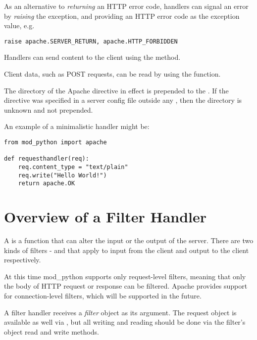 As an alternative to \emph{returning} an HTTP error code, handlers can
signal an error by \emph{raising} the 
exception, and providing an HTTP error code as the exception value,
e.g.

\begin{verbatim}
raise apache.SERVER_RETURN, apache.HTTP_FORBIDDEN
\end{verbatim}

Handlers can send content to the client using the 
method. 

Client data, such as POST requests, can be read by using the
 function.

\begin{notice}
  The directory of the Apache  
  directive in effect is prepended to the . If the
  directive was specified in a server config file outside any
  , then the directory is unknown and not prepended.
\end{notice}

An example of a minimalistic handler might be: 

\begin{verbatim}
from mod_python import apache

def requesthandler(req):
    req.content_type = "text/plain"
    req.write("Hello World!")
    return apache.OK
\end{verbatim}

\section{Overview of a Filter Handler\label{pyapi-filter}}

A  is a function that can alter the input or the
output of the server. There are two kinds of filters -  and
 that apply to input from the client and output to the
client respectively.

At this time mod_python supports only request-level filters, meaning
that only the body of HTTP request or response can be filtered. Apache
provides support for connection-level filters, which will be supported
in the future.

A filter handler receives a \emph{filter} object as its argument. The
request object is available as well via , but all
writing and reading should be done via the filter's object read and
write methods.

